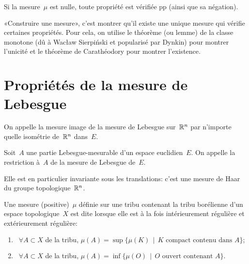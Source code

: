 Si la mesure~$\mu$ est nulle, toute propriété est vérifiée pp (ainsi que sa négation).

\medskip
{}
«Construire une mesure», c'est montrer qu'il existe une unique mesure qui vérifie certaines propriétés. 
Pour cela, on utilise le théorème (ou lemme) de la classe monotone (dû à Wacław Sierpiński et popularisé par Dynkin) pour montrer l'unicité et le théorème de Carathéodory pour montrer l'existence.

\section{Propriétés de la mesure de Lebesgue}

On appelle  la mesure image de la mesure de Lebesgue sur~$\mathbb R^n$ par n'importe quelle isométrie de~$\mathbb R^n$ dans~$E$.

Soit~$A$ une partie Lebesgue-mesurable d'un espace euclidien~$E$.
On appelle  la restriction à~$A$ de la mesure de Lebesgue de~$E$.

\begin{theoreme}
Elle est en particulier invariante sous les translations: c'est une mesure de Haar 
du groupe topologique~$\mathbb R^n$.
\end{theoreme}


\begin{definition}
Une mesure (positive)~$\mu$ définie sur une tribu contenant la tribu borélienne d'un espace topologique~$X$ est dite  lorsque elle est à la fois intérieurement régulière et extérieurement régulière:
\begin{enumerate}
\item~$\forall A\subset X$ de la tribu, $\mu(A)=\sup\{\mu(K)\,\mid\, K \text{ compact contenu dans } A\}$;
\item~$\forall A\subset X$ de la tribu, $\mu(A)=\inf\{\mu(O)\,\mid\, O \text{ ouvert contenant } A\}$.
\end{enumerate}
\end{definition}

